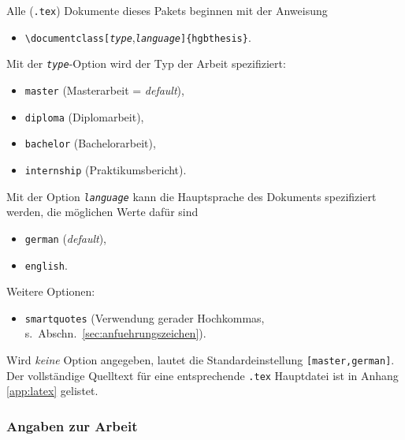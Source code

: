 Alle (\verb!.tex!) Dokumente dieses Pakets beginnen mit der Anweisung
%
\begin{itemize}
\item[] \verb!\documentclass[!\texttt{\emph{type}},\texttt{\emph{language}}\verb!]{hgbthesis}!.
\end{itemize}
%
Mit der \texttt{\emph{type}}-Option wird der Typ der Arbeit spezifiziert: 
%
\begin{itemize}
\item[] \verb!master! (Masterarbeit = \emph{default}),
\item[] \verb!diploma! (Diplomarbeit),
\item[] \verb!bachelor! (Bachelorarbeit),
\item[] \verb!internship! (Praktikumsbericht).
\end{itemize}
%
Mit der Option \texttt{\emph{language}} kann die Hauptsprache des Dokuments spezifiziert werden, 
die möglichen Werte dafür sind
%
\begin{itemize}
\item[] \verb!german! (\emph{default}),
\item[] \verb!english!.
\end{itemize}
%
Weitere Optionen:
\begin{itemize}
\item[] \verb!smartquotes! (Verwendung gerader Hochkommas, s.\ Abschn.~\ref{sec:anfuehrungszeichen}).
\end{itemize}
Wird \emph{keine} Option angegeben, lautet die Standardeinstellung \texttt{[master,german]}.
Der vollständige Quelltext für eine entsprechende \verb!.tex! Hauptdatei ist in Anhang \ref{app:latex} 
gelistet.


\subsubsection{Angaben zur Arbeit}

